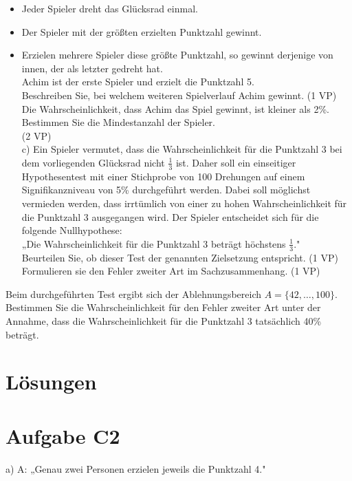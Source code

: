 \documentclass[10pt]{article}
\begin{document}
\begin{itemize}
  \item Jeder Spieler dreht das Glücksrad einmal.
  \item Der Spieler mit der größten erzielten Punktzahl gewinnt.
  \item Erzielen mehrere Spieler diese größte Punktzahl, so gewinnt derjenige von innen, der als letzter gedreht hat.\\
Achim ist der erste Spieler und erzielt die Punktzahl 5.\\
Beschreiben Sie, bei welchem weiteren Spielverlauf Achim gewinnt. (1 VP)\\
Die Wahrscheinlichkeit, dass Achim das Spiel gewinnt, ist kleiner als 2\%.\\
Bestimmen Sie die Mindestanzahl der Spieler.\\
(2 VP)\\
c) Ein Spieler vermutet, dass die Wahrscheinlichkeit für die Punktzahl 3 bei dem vorliegenden Glücksrad nicht $\frac{1}{3}$ ist. Daher soll ein einseitiger Hypothesentest mit einer Stichprobe von 100 Drehungen auf einem Signifikanzniveau von 5\% durchgeführt werden. Dabei soll möglichst vermieden werden, dass irrtümlich von einer zu hohen Wahrscheinlichkeit für die Punktzahl 3 ausgegangen wird. Der Spieler entscheidet sich für die folgende Nullhypothese:\\
„Die Wahrscheinlichkeit für die Punktzahl 3 beträgt höchstens $\frac{1}{3}$."\\
Beurteilen Sie, ob dieser Test der genannten Zielsetzung entspricht. (1 VP) Formulieren sie den Fehler zweiter Art im Sachzusammenhang. (1 VP)
\end{itemize}

Beim durchgeführten Test ergibt sich der Ablehnungsbereich $A=\{42, \ldots, 100\}$. Bestimmen Sie die Wahrscheinlichkeit für den Fehler zweiter Art unter der Annahme, dass die Wahrscheinlichkeit für die Punktzahl 3 tatsächlich 40\% beträgt.

\section*{Lösungen}
\section*{Aufgabe C2}
a) A: „Genau zwei Personen erzielen jeweils die Punktzahl 4."
\end{document}

